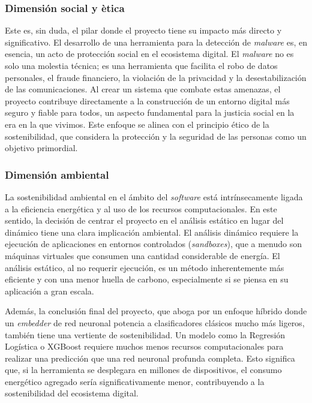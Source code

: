 \subsubsection{Dimensión social y ètica}
Este es, sin duda, el pilar donde el proyecto tiene su impacto más directo y significativo. El desarrollo de una herramienta para la detección de \textit{malware} es, en esencia, un acto de protección social en el ecosistema digital. El \textit{malware} no es solo una molestia técnica; es una herramienta que facilita el robo de datos personales, el fraude financiero, la violación de la privacidad y la desestabilización de las comunicaciones. Al crear un sistema que combate estas amenazas, el proyecto contribuye directamente a la construcción de un entorno digital más seguro y fiable para todos, un aspecto fundamental para la justicia social en la era en la que vivimos. Este enfoque se alinea con el principio ético de la sostenibilidad, que considera la protección y la seguridad de las personas como un objetivo primordial.

\subsubsection{Dimensión ambiental}
La sostenibilidad ambiental en el ámbito del \textit{software} está intrínsecamente ligada a la eficiencia energética y al uso de los recursos computacionales. En este sentido, la decisión de centrar el proyecto en el análisis estático en lugar del dinámico tiene una clara implicación ambiental. El análisis dinámico requiere la ejecución de aplicaciones en entornos controlados (\textit{sandboxes}), que a menudo son máquinas virtuales que consumen una cantidad considerable de energía. El análisis estático, al no requerir ejecución, es un método inherentemente más eficiente y con una menor huella de carbono, especialmente si se piensa en su aplicación a gran escala.

Además, la conclusión final del proyecto, que aboga por un enfoque híbrido donde un \textit{embedder} de red neuronal potencia a clasificadores clásicos mucho más ligeros, también tiene una vertiente de sostenibilidad. Un modelo como la Regresión Logística o XGBoost requiere muchos menos recursos computacionales para realizar una predicción que una red neuronal profunda completa. Esto significa que, si la herramienta se desplegara en millones de dispositivos, el consumo energético agregado sería significativamente menor, contribuyendo a la sostenibilidad del ecosistema digital.

